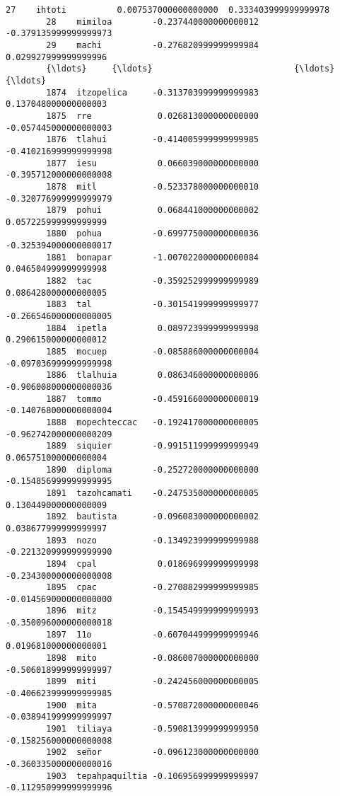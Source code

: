 \documentclass[11pt]{article}
\begin{document}
\begin{Verbatim}[commandchars=\\\{\}]
        27    ihtoti          0.007537000000000000  0.333403999999999978   
        28    mimiloa        -0.237440000000000012 -0.379135999999999973   
        29    machi          -0.276820999999999984  0.029927999999999996   
        {\ldots}     {\ldots}                            {\ldots}                   {\ldots}   
        1874  itzopelica     -0.313703999999999983  0.137048000000000003   
        1875  rre             0.026813000000000000 -0.057445000000000003   
        1876  tlahui         -0.414005999999999985 -0.410216999999999998   
        1877  iesu            0.066039000000000000 -0.395712000000000008   
        1878  mitl           -0.523378000000000010 -0.320776999999999979   
        1879  pohui           0.068441000000000002  0.057225999999999999   
        1880  pohua          -0.699775000000000036 -0.325394000000000017   
        1881  bonapar        -1.007022000000000084  0.046504999999999998   
        1882  tac            -0.359252999999999989  0.086428000000000005   
        1883  tal            -0.301541999999999977 -0.266546000000000005   
        1884  ipetla          0.089723999999999998  0.290615000000000012   
        1885  mocuep         -0.085886000000000004 -0.097036999999999998   
        1886  tlalhuia        0.086346000000000006 -0.906008000000000036   
        1887  tommo          -0.459166000000000019 -0.140768000000000004   
        1888  mopechteccac   -0.192417000000000005 -0.962742000000000209   
        1889  siquier        -0.991511999999999949  0.065751000000000004   
        1890  diploma        -0.252720000000000000 -0.154856999999999995   
        1891  tazohcamati    -0.247535000000000005  0.130449000000000009   
        1892  bautista       -0.096083000000000002  0.038677999999999997   
        1893  nozo           -0.134923999999999988 -0.221320999999999990   
        1894  cpal            0.018696999999999998 -0.234300000000000008   
        1895  cpac           -0.270882999999999985 -0.014569000000000000   
        1896  mitz           -0.154549999999999993 -0.350096000000000018   
        1897  11o            -0.607044999999999946  0.019681000000000001   
        1898  mito           -0.086007000000000000 -0.506018999999999997   
        1899  miti           -0.242456000000000005 -0.406623999999999985   
        1900  mita           -0.570872000000000046 -0.038941999999999997   
        1901  tiliaya        -0.590813999999999950 -0.158256000000000008   
        1902  señor          -0.096123000000000000 -0.360335000000000016   
        1903  tepahpaquiltia -0.106956999999999997 -0.112950999999999996   
        

\end{Verbatim}
\end{document}
